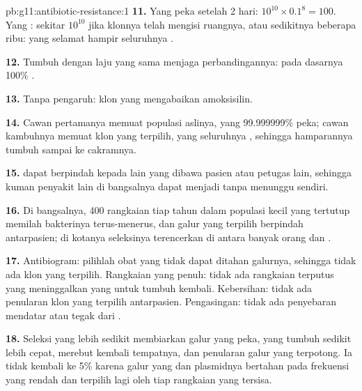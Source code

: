 \begin{solution}{pb:g11:antibiotic-resistance:1}
\textbf{11.} Yang peka setelah 2 hari: $10^{10} \times 0.1^8 = 100$.
Yang : sekitar $10^{10}$ jika klonnya telah mengisi ruangnya, atau
sedikitnya beberapa ribu: yang selamat hampir seluruhnya .

\textbf{12.} Tumbuh dengan laju yang sama menjaga perbandingannya: pada
dasarnya 100\% .

\textbf{13.} Tanpa pengaruh: klon yang  mengabaikan amoksisilin.

\textbf{14.} Cawan pertamanya memuat populasi aslinya, yang
99.999999\% peka; cawan kambuhnya memuat klon yang terpilih, yang
seluruhnya , sehingga hamparannya tumbuh sampai ke cakramnya.

\textbf{15.}  dapat berpindah kepada  lain yang dibawa
pasien atau petugas lain, sehingga kuman penyakit lain di bangsalnya
dapat menjadi  tanpa menunggu  sendiri.

\textbf{16.} Di bangsalnya, 400 rangkaian tiap tahun dalam populasi
kecil yang tertutup memilah bakterinya terus-menerus, dan galur yang
terpilih berpindah antarpasien; di kotanya seleksinya terencerkan di
antara banyak orang dan .

\textbf{17.} Antibiogram: pilihlah obat yang tidak dapat ditahan
galurnya, sehingga tidak ada klon yang terpilih. Rangkaian yang penuh:
tidak ada rangkaian terputus yang meninggalkan yang  untuk tumbuh
kembali. Kebersihan: tidak ada penularan klon yang terpilih
antarpasien. Pengasingan: tidak ada penyebaran mendatar atau tegak dari
.

\textbf{18.} Seleksi yang lebih sedikit membiarkan galur yang peka,
yang tumbuh sedikit lebih cepat, merebut kembali tempatnya, dan
penularan galur yang  terpotong. Ia tidak kembali ke 5\% karena
galur yang  dan plasmidnya bertahan pada frekuensi yang rendah dan
terpilih lagi oleh tiap rangkaian yang tersisa.


\end{solution}
